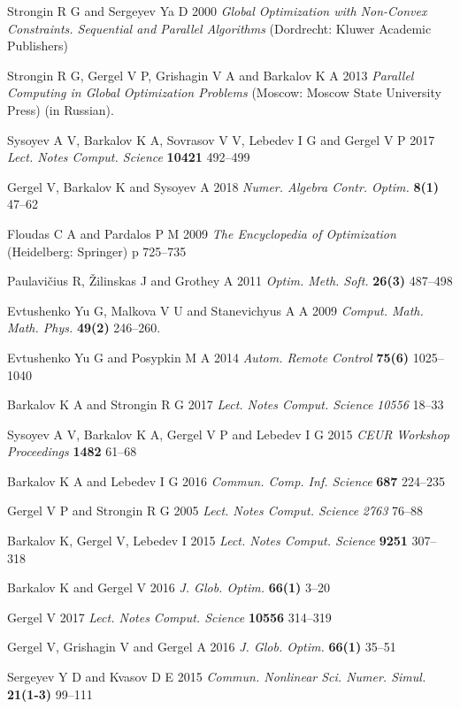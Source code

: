 \documentclass[a4paper]{jpconf}
\begin{document}
\begin{thebibliography}{9}

Strongin R G and Sergeyev Ya D 2000 \textit{Global Optimization with Non-Convex Constraints. Sequential 
and Parallel Algorithms} (Dordrecht: Kluwer Academic Publishers)

Strongin R G, Gergel V P, Grishagin V A and Barkalov K A 2013  \textit{Parallel Computing in Global Optimization Problems} (Moscow: Moscow State University Press) (in Russian).

Sysoyev A V, Barkalov K A, Sovrasov V V, Lebedev I G and Gergel V P 2017 \textit{Lect. Notes Comput. Science} \textbf{10421} 492--499

Gergel  V, Barkalov K and Sysoyev A 2018 \textit{Numer. Algebra Contr. Optim.} \textbf{8(1)} 47--62

Floudas C A and Pardalos P M 2009 \textit{The Encyclopedia of Optimization } (Heidelberg: Springer) p 725--735 

Paulavi\v{c}ius R, \v{Z}ilinskas J and Grothey A 2011 \textit{Optim. Meth. Soft.} \textbf{26(3)} 487--498

Evtushenko Yu G, Malkova V U and Stanevichyus A A 2009 \textit{Comput. Math. Math. Phys.} \textbf{49(2)} 246--260.

Evtushenko Yu G and Posypkin M A 2014 \textit{Autom. Remote Control} \textbf{75(6)} 1025--1040

Barkalov K A and Strongin R G 2017 \textit{Lect. Notes Comput. Science} \textit{10556} 18--33

Sysoyev A V, Barkalov K A, Gergel V P and Lebedev I G 2015 \textit{CEUR Workshop Proceedings} \textbf{1482} 61--68

Barkalov K A and Lebedev I G 2016 \textit{Commun. Comp. Inf. Science} \textbf{687} 224--235

Gergel V P and Strongin R G 2005 \textit{Lect. Notes Comput. Science} \textit{2763} 76--88

Barkalov K, Gergel V, Lebedev I 2015 \textit{Lect. Notes Comput. Science} \textbf{9251} 307--318

Barkalov K and Gergel V 2016 \textit{J. Glob. Optim.} \textbf{66(1)} 3--20

Gergel V 2017 \textit{Lect. Notes Comput. Science} \textbf{10556} 314--319

Gergel V, Grishagin V and Gergel A 2016 \textit{J. Glob. Optim.} \textbf{66(1)} 35--51

Sergeyev Y D and Kvasov D E 2015 \textit{Commun. Nonlinear Sci. Numer. Simul.} \textbf{21(1-3)} 99--111

\end{thebibliography}
\end{document}
